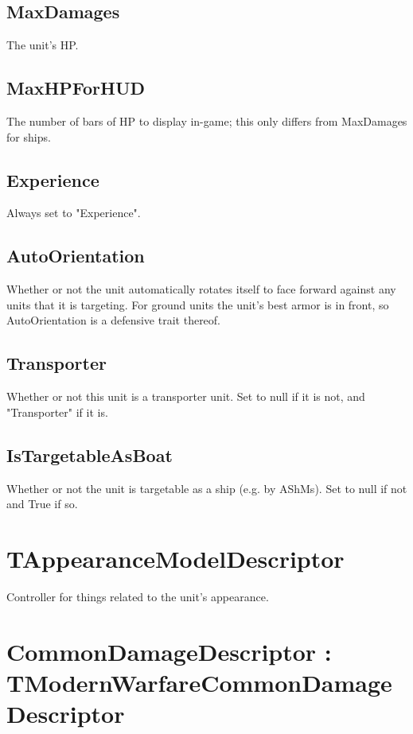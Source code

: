 \documentclass{article}
\begin{document}
\subsection{MaxDamages}

The unit's HP.

\subsection{MaxHPForHUD}

The number of bars of HP to display in-game; this only differs from MaxDamages for ships.

\subsection{Experience}

Always set to "Experience".

\subsection{AutoOrientation}

Whether or not the unit automatically rotates itself to face forward against any units that it is targeting. For ground units the unit's best armor is in front, so AutoOrientation is a defensive trait thereof.

\subsection{Transporter}

Whether or not this unit is a transporter unit. Set to null if it is not, and "Transporter" if it is.

\subsection{IsTargetableAsBoat}

Whether or not the unit is targetable as a ship (e.g. by AShMs). Set to null if not and True if so.

\section{TAppearanceModelDescriptor}

Controller for things related to the unit's appearance.

\section{CommonDamageDescriptor : TModernWarfareCommonDamageDescriptor}
\end{document}
